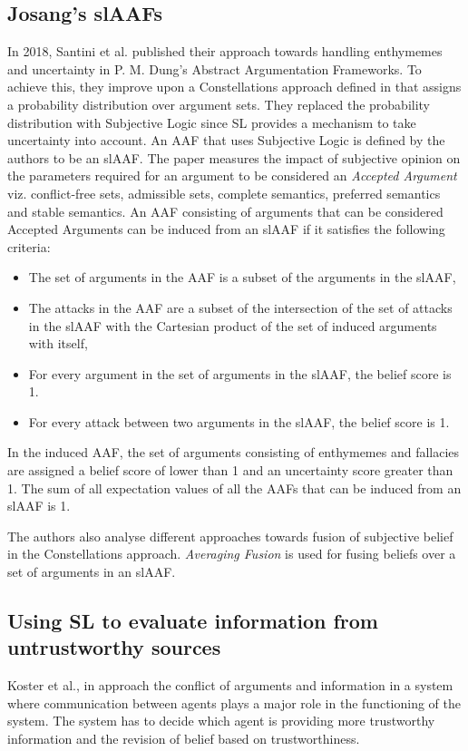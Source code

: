 \documentclass[sigconf]{acmart}
\begin{document}
\subsection{Josang's slAAFs}
In 2018, Santini et al. published their approach towards handling enthymemes and uncertainty in P. M. Dung's Abstract Argumentation Frameworks. To achieve this, they improve upon a Constellations approach defined in \cite{dung2010towards} that assigns a probability distribution over argument sets.  They replaced the probability distribution with Subjective Logic since SL provides a mechanism to take uncertainty into account. An AAF that
uses Subjective Logic is defined by the authors to be an slAAF. The paper measures the impact of subjective opinion on the parameters required for an argument to be considered an \textit{Accepted Argument} viz. conflict-free sets, admissible sets, complete semantics, preferred semantics and stable semantics. An AAF consisting of arguments that can be considered Accepted Arguments can be induced from an slAAF if it satisfies the 
following criteria:
\begin{itemize}
  \item The set of arguments in the AAF is a subset of the arguments in the slAAF,
  \item The attacks in the AAF are a subset of the intersection of the set of attacks in the slAAF with the Cartesian product of the set of induced arguments with itself,
  \item For every argument in the set of arguments in the slAAF, the belief score is 1.
  \item For every attack between two arguments in the slAAF, the belief score is 1.
\end{itemize}
In the induced AAF, the set of arguments consisting of enthymemes and fallacies are assigned a belief score of lower than 1 and an uncertainty score greater than 1. The sum of all expectation values of all the AAFs that can be induced from an slAAF is 1.

The authors also analyse different approaches towards fusion of subjective belief in the Constellations approach. \textit{Averaging Fusion} is used for fusing beliefs over a set of 
arguments in an slAAF.

\subsection{Using SL to evaluate information from untrustworthy sources}
Koster et al., in \cite{Koster2017} approach the conflict of arguments and information in a system where communication between agents plays
a major role in the functioning of the system. The system has to decide which agent is providing more trustworthy information
and the revision of belief based on trustworthiness. 
\end{document}
